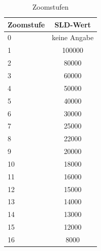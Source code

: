 \begin{table}[h!]
  \begin{center}
    \begin{tabular}{ l | c }
	Zoomstufe & SLD-Wert \\
\hline
  0 & keine Angabe \\
  1 & 100000 \\
  2 & 80000 \\
  3 & 60000 \\
  4 & 50000 \\
  5 & 40000 \\
  6 & 30000 \\
  7 & 25000 \\
  8 & 22000 \\
  9 & 20000 \\
  10 & 18000 \\
  11 & 16000 \\
  12 & 15000 \\
  13 & 14000 \\
  14 & 13000 \\
  15 & 12000 \\
  16 & 8000 \\
	\end{tabular}
	
    \caption{Zoomstufen}
    \label{table:zoom}
  \end{center}
\end{table}
